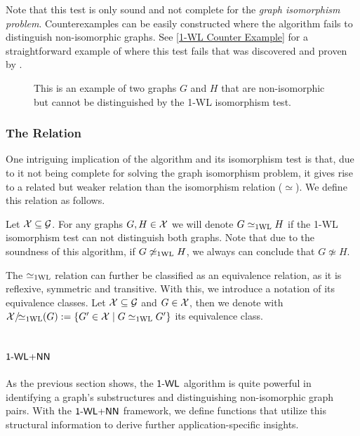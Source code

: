 Note that this test is only sound and not complete for the \textit{graph isomorphism problem}. Counterexamples can be easily constructed where the algorithm fails to distinguish non-isomorphic graphs. See \autoref{1-WL Counter Example} for a straightforward example of where this test fails that was discovered and proven by \cite{Cai1992}.
\begin{figure}[H]
    \centering
    
    \caption{This is an example of two graphs $G$ and $H$ that are non-isomorphic but cannot be distinguished by the 1-WL isomorphism test.}
    \label{1-WL Counter Example}
\end{figure}

\subsubsection{The \wl Relation}
One intriguing implication of the \wl algorithm and its isomorphism test is that, due to it not being complete for solving the graph isomorphism problem, it gives rise to a related but weaker relation than the isomorphism relation ($\simeq$). We define this relation as follows.

\begin{definition}[1-WL Relation]
    Let $\mathcal{X} \subseteq \mathcal{G}$. For any graphs $G,H \in \mathcal{X}$ we will denote $G \simeq_{\text{1WL}} H$ if the 1-WL isomorphism test can not distinguish both graphs. Note that due to the soundness of this algorithm, if $G \not\simeq_{\text{1WL}} H$, we always can conclude that $G \not\simeq H$.
\end{definition}

The $\simeq_{\text{1WL}}$ relation can further be classified as an equivalence relation, as it is reflexive, symmetric and transitive. With this, we introduce a notation of its equivalence classes. Let $\mathcal{X} \subseteq \mathcal{G}$ and $G \in \mathcal{X}$, then we denote with $\mathcal{X}/\!{\simeq_{\text{1WL}}}(G): = \{ G' \in \mathcal{X} \mid G \simeq_{\text{1WL}} G' \}$ its equivalence class.

\subsection{$\textsf{1-WL+NN}$}\label{sec:definition_wlnn}
As the previous section shows, the $\textsf{1-WL}$ algorithm is quite powerful in identifying a graph's substructures and distinguishing non-isomorphic graph pairs. With the $\textsf{1-WL+NN}$ framework, we define functions that utilize this structural information to derive further application-specific insights.

